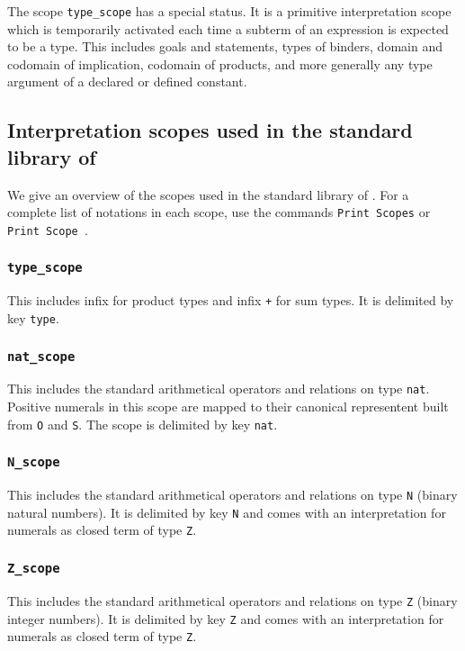 The scope {\tt type\_scope} has a special status. It is a primitive
interpretation scope which is temporarily activated each time a
subterm of an expression is expected to be a type. This includes goals
and statements, types of binders, domain and codomain of implication,
codomain of products, and more generally any type argument of a
declared or defined constant.

\subsection{Interpretation scopes used in the standard library of {\Coq}}

We give an overview of the scopes used in the standard library of
{\Coq}. For a complete list of notations in each scope, use the
commands {\tt Print Scopes} or {\tt Print Scope {\scope}}.

\subsubsection{\tt type\_scope}

This includes infix {\tt *} for product types and infix {\tt +} for
sum types. It is delimited by key {\tt type}.

\subsubsection{\tt nat\_scope}

This includes the standard arithmetical operators and relations on
type {\tt nat}. Positive numerals in this scope are mapped to their
canonical representent built from {\tt O} and {\tt S}. The scope is
delimited by key {\tt nat}.

\subsubsection{\tt N\_scope}

This includes the standard arithmetical operators and relations on
type {\tt N} (binary natural numbers). It is delimited by key {\tt N}
and comes with an interpretation for numerals as closed term of type {\tt Z}.

\subsubsection{\tt Z\_scope}

This includes the standard arithmetical operators and relations on
type {\tt Z} (binary integer numbers). It is delimited by key {\tt Z} 
and comes with an interpretation for numerals as closed term of type {\tt Z}.

